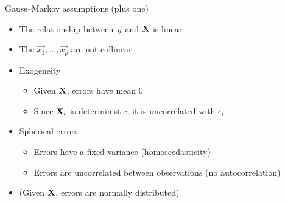 \begin{frame}{Gauss--Markov assumptions (plus one)}
    \begin{itemize}
        \item The relationship between $\vec{y}$ and $\mathbf{X}$ is linear
        \item The $\vec{x_{1}}, \ldots, \vec{x_{p}}$ are not collinear
        \item Exogeneity
              \begin{itemize}
                  \item Given $\mathbf{X}$, errors have mean 0
                  \item Since $\mathbf{X}_{i}$ is deterministic, it is uncorrelated
                        with $\epsilon_{i}$
              \end{itemize}
        \item Spherical errors
              \begin{itemize}
                  \item Errors have a fixed variance (homoscedasticity)
                  \item Errors are uncorrelated between observations
                        (no autocorrelation)
              \end{itemize}
        \item (Given $\mathbf{X}$, errors are normally distributed)
    \end{itemize}
\end{frame}

